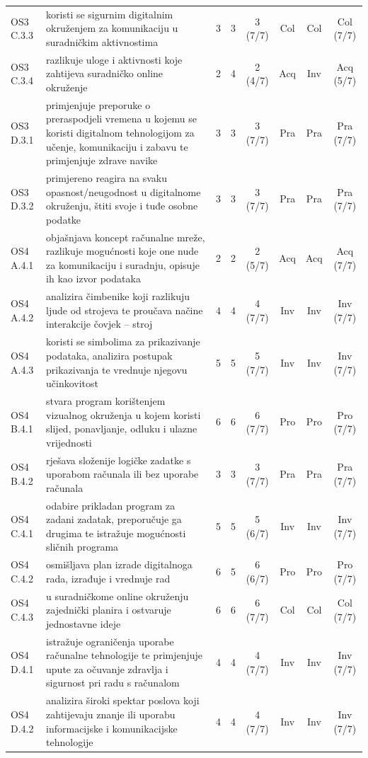 \documentclass[journal,article,submit,pdftex,moreauthors]{Definitions/mdpi}
\begin{document}
{\begin{longtable}{p{1.35cm}p{6.6cm}cccccc}
OS3 C.3.3 & koristi se sigurnim digitalnim okruženjem za komunikaciju u suradničkim aktivnostima & 3 & 3 & 3 (7/7) & Col & Col & Col (7/7) \\
OS3 C.3.4 & razlikuje uloge i aktivnosti koje zahtijeva suradničko online okruženje & 2 & 4 & 2 (4/7) & Acq & Inv & Acq (5/7) \\
OS3 D.3.1 & primjenjuje preporuke o preraspodjeli vremena u kojemu se koristi digitalnom tehnologijom za učenje, komunikaciju i zabavu te primjenjuje zdrave navike & 3 & 3 & 3 (7/7) & Pra & Pra & Pra (7/7) \\
OS3 D.3.2 & primjereno reagira na svaku opasnost/neugodnost u digitalnome okruženju, štiti svoje i tuđe osobne podatke & 3 & 3 & 3 (7/7) & Pra & Pra & Pra (7/7) \\
OS4 A.4.1 & objašnjava koncept računalne mreže, razlikuje mogućnosti koje one nude za komunikaciju i suradnju, opisuje ih kao izvor podataka & 2 & 2 & 2 (5/7) & Acq & Acq & Acq (7/7) \\
OS4 A.4.2 & analizira čimbenike koji razlikuju ljude od strojeva te proučava načine interakcije čovjek – stroj & 4 & 4 & 4 (7/7) & Inv & Inv & Inv (7/7) \\
OS4 A.4.3 & koristi se simbolima za prikazivanje podataka, analizira postupak prikazivanja te vrednuje njegovu učinkovitost & 5 & 5 & 5 (7/7) & Inv & Inv & Inv (7/7) \\
OS4 B.4.1 & stvara program korištenjem vizualnog okruženja u kojem koristi slijed, ponavljanje, odluku i ulazne vrijednosti & 6 & 6 & 6 (7/7) & Pro & Pro & Pro (7/7) \\
OS4 B.4.2 & rješava složenije logičke zadatke s uporabom računala ili bez uporabe računala & 3 & 3 & 3 (7/7) & Pra & Pra & Pra (7/7) \\
OS4 C.4.1 & odabire prikladan program za zadani zadatak, preporučuje ga drugima te istražuje mogućnosti sličnih programa & 5 & 5 & 5 (6/7) & Inv & Inv & Inv (7/7) \\
OS4 C.4.2 & osmišljava plan izrade digitalnoga rada, izrađuje i vrednuje rad & 6 & 5 & 6 (6/7) & Pro & Pro & Pro (7/7) \\
OS4 C.4.3 & u suradničkome online okruženju zajednički planira i ostvaruje jednostavne ideje & 6 & 6 & 6 (7/7) & Col & Col & Col (7/7) \\
OS4 D.4.1 & istražuje ograničenja uporabe računalne tehnologije te primjenjuje upute za očuvanje zdravlja i sigurnost pri radu s računalom & 4 & 4 & 4 (7/7) & Inv & Inv & Inv (7/7) \\
OS4 D.4.2 & analizira široki spektar poslova koji zahtijevaju znanje ili uporabu informacijske i komunikacijske tehnologije & 4 & 4 & 4 (7/7) & Inv & Inv & Inv (7/7) \\

\end{longtable}}
\end{document}
